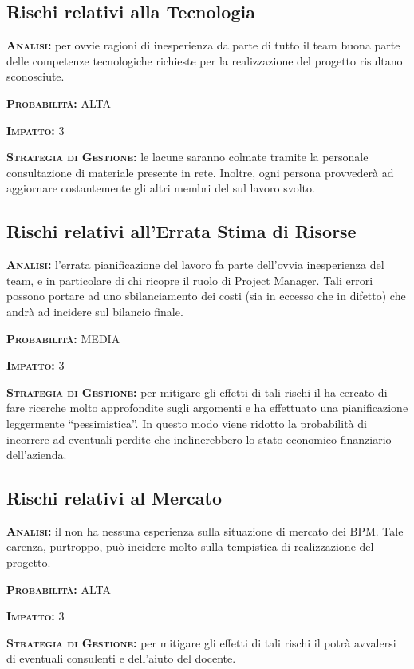 \subsection{Rischi relativi alla Tecnologia}
\begin{description}
	\item{\scshape\bfseries Analisi:} per ovvie ragioni di inesperienza da parte di tutto il team buona parte delle competenze tecnologiche richieste per la realizzazione del progetto risultano sconosciute.
	\item{\scshape\bfseries Probabilità:} ALTA 
	\item{\scshape\bfseries Impatto:} 3 
	\item{\scshape\bfseries Strategia di Gestione:} le lacune saranno colmate tramite la personale consultazione di materiale presente in rete. Inoltre, ogni persona provvederà ad aggiornare costantemente gli altri membri del  sul lavoro svolto.
	
	
	
\subsection{Rischi relativi all'Errata Stima di Risorse}
\begin{description}
	\item{\scshape\bfseries Analisi:} l'errata pianificazione del lavoro fa parte dell'ovvia inesperienza del team, e in particolare di chi ricopre il ruolo di Project Manager. Tali errori possono portare ad uno sbilanciamento dei costi (sia in eccesso che in difetto) che andrà ad incidere sul bilancio finale.
	\item{\scshape\bfseries Probabilità:} MEDIA
	\item{\scshape\bfseries Impatto:} 3 
	\item{\scshape\bfseries Strategia di Gestione:} per mitigare gli effetti di tali rischi il  ha cercato di fare ricerche molto approfondite sugli argomenti e ha effettuato una pianificazione leggermente ``pessimistica''. In questo modo viene ridotto la probabilità di incorrere ad eventuali perdite che inclinerebbero lo stato economico-finanziario dell'azienda.
\end{description}	
	
	
\subsection{Rischi relativi al Mercato}
\begin{description}
	\item{\scshape\bfseries Analisi:} il  non ha nessuna esperienza sulla situazione di mercato dei  BPM. Tale carenza, purtroppo, può incidere molto sulla tempistica di realizzazione del progetto.
	\item{\scshape\bfseries Probabilità:} ALTA
	\item{\scshape\bfseries Impatto:} 3 
	\item{\scshape\bfseries Strategia di Gestione:} per mitigare gli effetti di tali rischi il  potrà avvalersi di eventuali consulenti e dell'aiuto del docente.
\end{description}	
	
	

\end{description}


